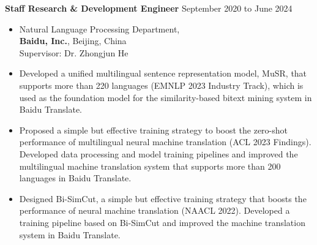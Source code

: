 \documentclass[10pt]{article}
\newenvironment{innerlist}[1][\enskip\textbullet]%
        {\begin{itemize}[#1,leftmargin=*,parsep=0pt,itemsep=0pt,topsep=0pt,partopsep=0pt]}
        {\end{itemize}}
\begin{document}
\textbf{Staff Research \& Development Engineer} \hfill {September 2020 to June 2024}
\begin{innerlist}
\item[] Natural Language Processing Department,\\
\textbf{Baidu, Inc.}, Beijing, China \\
Supervisor: Dr. Zhongjun He
\item Developed a unified multilingual sentence representation model, MuSR, that supports more than 220 languages (EMNLP 2023 Industry Track), which is used as the foundation model for the similarity-based bitext mining system in Baidu Translate.
\item Proposed a simple but effective training strategy to boost the zero-shot performance of multilingual neural machine translation (ACL 2023 Findings). Developed data processing and model training pipelines and improved the multilingual machine translation system that supports more than 200 languages in Baidu Translate.
\item Designed Bi-SimCut, a simple but effective training strategy that boosts the performance of neural machine translation (NAACL 2022). Developed a training pipeline based on Bi-SimCut and improved the machine translation system in Baidu Translate.
\end{innerlist}

\
\end{document}
